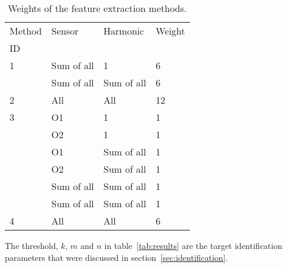 	\begin{table}[h]
		\centering
		\begin{tabular}{|l|l|l|l|}\hline
Method	& Sensor 	& Harmonic		& Weight\\
ID		& 		 	&  				& 		\\\hline
1		& Sum of all& 1				& 6		\\\cline{2-4}
		& Sum of all& Sum of all	& 6		\\\hline
2		& All	 	& All			& 12	\\\hline
3		& O1	 	& 1				& 1		\\\cline{2-4}
		& O2	 	& 1				& 1		\\\cline{2-4}
		& O1	 	& Sum of all	& 1		\\\cline{2-4}
		& O2	 	& Sum of all	& 1		\\\cline{2-4}
		& Sum of all& Sum of all	& 1		\\\cline{2-4}
		& Sum of all& Sum of all	& 1		\\\hline
4		& All		& All			& 6		\\\hline
		\end{tabular}
		\caption{Weights of the feature extraction methods.}
		\label{tab:weights}
	\end{table}

The threshold, $k$, $m$ and $n$ in table~\ref{tab:results} are the \gls{target} identification parameters that were discussed in section~\ref{sec:identification}.

